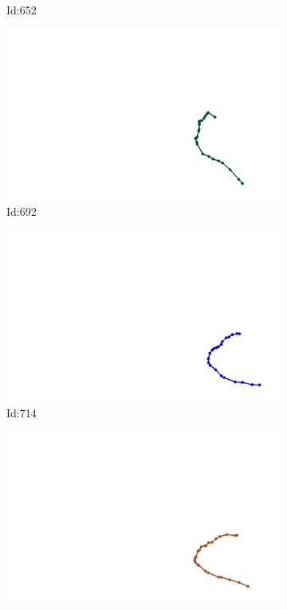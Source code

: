 \documentclass[12pt,twoside]{report}
\begin{document}
\begin{figure}
\begin{subfigure}[b]{0.20\textwidth}
\caption{Id:652}
\end{subfigure}
\begin{subfigure}[b]{0.20\textwidth}
\centering
\includegraphics[width=\textwidth]{../trajectories/692.png}
\caption{Id:692}
\end{subfigure}
\begin{subfigure}[b]{0.20\textwidth}
\centering
\includegraphics[width=\textwidth]{../trajectories/714.png}
\caption{Id:714}
\end{subfigure}
\begin{subfigure}[b]{0.20\textwidth}
\centering
\includegraphics[width=\textwidth]{../trajectories/719.png}

\end{subfigure}
\end{figure}
\end{document}

